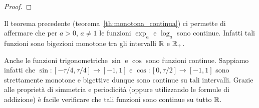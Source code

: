 \begin{proof}
%  
%  
%  
%  
\end{proof}

Il teorema precedente (teorema~\ref{th:monotona_continua}) 
ci permette di affermare che per $a>0$, $a\neq 1$ 
le funzioni $\exp_a$ e $\log_a$ sono continue. 
Infatti tali funzioni sono bigezioni monotone tra 
gli intervalli ${\mathbb R}$ e ${\mathbb R}_+$.

Anche le funzioni trigonometriche $\sin$ e $\cos$ sono funzioni continue.
Sappiamo infatti che $\sin \colon [-\tau/4,\tau /4]\to [-1,1]$
e $\cos\colon [0,\tau/2]\to [-1,1]$ sono strettamente monotone 
e bigettive dunque sono continue su tali intervalli. 
Grazie alle proprietà di simmetria e periodicità
(oppure utilizzando le formule di addizione) è facile verificare 
che tali funzioni sono continue su tutto ${\mathbb R}$.

